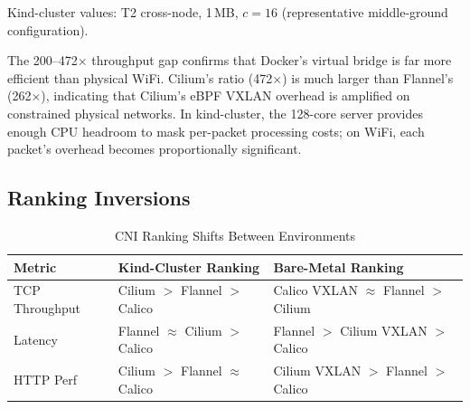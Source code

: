 \documentclass[11pt,a4paper]{article}
\begin{document}
{\footnotesize Kind-cluster values: T2 cross-node, 1\,MB, $c=16$ (representative middle-ground configuration).}

The 200--472$\times$ throughput gap confirms that Docker's virtual bridge is far more efficient than physical WiFi. Cilium's ratio (472$\times$) is much larger than Flannel's (262$\times$), indicating that Cilium's eBPF VXLAN overhead is amplified on constrained physical networks. In kind-cluster, the 128-core server provides enough CPU headroom to mask per-packet processing costs; on WiFi, each packet's overhead becomes proportionally significant.

\subsection{Ranking Inversions}

\begin{table}[H]
\centering
\caption{CNI Ranking Shifts Between Environments}
\begin{tabular}{lll}
  \toprule
  \textbf{Metric} & \textbf{Kind-Cluster Ranking} & \textbf{Bare-Metal Ranking} \\
  \midrule
  TCP Throughput & Cilium $>$ Flannel $>$ Calico & Calico VXLAN $\approx$ Flannel $>$ Cilium \\
  Latency & Flannel $\approx$ Cilium $>$ Calico & Flannel $>$ Cilium VXLAN $>$ Calico \\
  HTTP Perf & Cilium $>$ Flannel $\approx$ Calico & Cilium VXLAN $>$ Flannel $>$ Calico \\
  \bottomrule
\end{tabular}
\label{tab:ranking-shifts}
\end{table}
\end{document}
